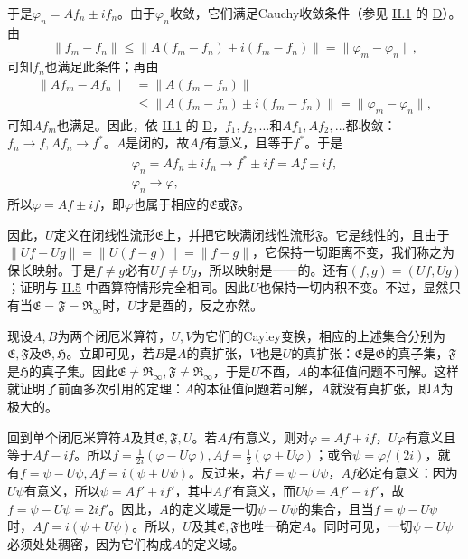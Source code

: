 \documentclass[fontsize=13pt,twoside,openany,headings=normal,parskip=false,bookmarkpackage=false,DIV=calc]{scrbook}
\begin{document}
\hypertarget{origpage-85}{}\label{origpage-85}于是$\varphi_n=Af_n\pm if_n$。由于$\varphi_n$收敛，它们满足Cauchy收敛条件（参见 \hyperref[sec:II.1]{II.1} 的 \hyperref[ax:II.D]{D}）。由
\[
\|f_m-f_n\|\leq\|A(f_m-f_n)\pm i(f_m-f_n)\|=\|\varphi_m-\varphi_n\|,
\]
可知$f_n$也满足此条件；再由
\begin{align*}
\|Af_m-Af_n\|&=\|A(f_m-f_n)\|\\
&\leq\|A(f_m-f_n)\pm i(f_m-f_n)\|=\|\varphi_m-\varphi_n\|,
\end{align*}
可知$Af_m$也满足。因此，依 \hyperref[sec:II.1]{II.1} 的 \hyperref[ax:II.D]{D}，$f_1,\allowbreak f_2,\allowbreak \ldots$和$Af_1,\allowbreak Af_2,\allowbreak \ldots$都收敛：$f_n\to f,\allowbreak Af_n\to f^*$。$A$是闭的，故$Af$有意义，且等于$f^*$。于是
\begin{gather*}
\varphi_n=Af_n\pm if_n\to f^*\pm if=Af\pm if,\\
\varphi_n\to\varphi,
\end{gather*}
所以$\varphi=Af\pm if$，即$\varphi$也属于相应的$\mathfrak E$或$\mathfrak F$。

因此，$U$定义在闭线性流形$\mathfrak E$上，并把它映满闭线性流形$\mathfrak F$。它是线性的，且由于$\|Uf-Ug\|=\|U(f-g)\|=\|f-g\|$，它保持一切距离不变，我们称之为保长映射。于是$f\ne g$必有$Uf\ne Ug$，所以映射是一一的。还有$(f,\allowbreak g)=(Uf,\allowbreak Ug)$；证明与 \hyperref[sec:II.5]{II.5} 中酉算符情形完全相同。因此$U$也保持一切内积不变。不过，显然只有当$\mathfrak E=\mathfrak F=\mathfrak R_\infty$时，$U$才是酉的，反之亦然。

现设$A,\allowbreak B$为两个闭厄米算符，$U,\allowbreak V$为它们的Cayley变换，相应的上述集合分别为$\mathfrak E,\allowbreak \mathfrak F$及$\mathfrak G,\allowbreak \mathfrak H$。立即可见，若$B$是$A$的真扩张，$V$也是$U$的真扩张：$\mathfrak E$是$\mathfrak G$的真子集，$\mathfrak F$是$\mathfrak H$的真子集。因此$\mathfrak E\ne\mathfrak R_\infty,\allowbreak \mathfrak F\ne\mathfrak R_\infty$，于是$U$不酉，$A$的本征值问题不可解。这样就证明了前面多次引用的定理：$A$的本征值问题若可解，$A$就没有真扩张，即$A$为极大的。

回到单个闭厄米算符$A$及其$\mathfrak E,\allowbreak \mathfrak F,\allowbreak U$。若$Af$有意义，则对$\varphi=Af+if$，$U\varphi$有意义且等于$Af-if$。所以$f=\frac1{2i}(\varphi-U\varphi),\allowbreak Af=\frac12(\varphi+U\varphi)$；或令$\psi=\varphi/(2i)$，就有$f=\psi-U\psi,\allowbreak Af=i(\psi+U\psi)$。反过来，若$f=\psi-U\psi$，$Af$必定有意义：因为$U\psi$有意义，所以$\psi=Af'+if'$，其中$Af'$有意义，而$U\psi=Af'-if'$，故$f=\psi-U\psi=2if'$。因此，$A$的定义域是一切$\psi-U\psi$的集合，且当$f=\psi-U\psi$时，$Af=i(\psi+U\psi)$。所以，$U$及其$\mathfrak E,\allowbreak \mathfrak F$也唯一确定$A$。同时可见，一切$\psi-U\psi$必须处处稠密，因为它们构成$A$的定义域。
\end{document}
